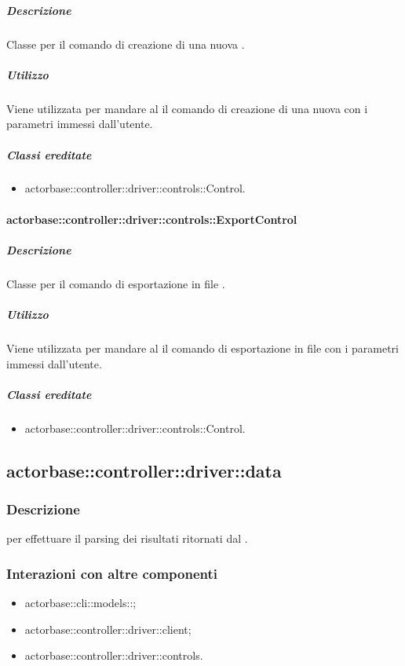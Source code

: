 \documentclass{scalatekids-article}
\begin{document}
\subparagraph{Descrizione}

Classe per il comando di creazione di una nuova .

\subparagraph{Utilizzo}

Viene utilizzata per mandare al  il comando di creazione di una
nuova  con i parametri immessi dall'utente.

\subparagraph{Classi ereditate}

\begin{itemize}
\item actorbase::controller::driver::controls::Control.
\end{itemize}

\paragraph{actorbase::controller::driver::controls::ExportControl}

\subparagraph{Descrizione}

Classe per il comando di esportazione in file .

\subparagraph{Utilizzo}

Viene utilizzata per mandare al  il comando di esportazione in
file  con i parametri immessi dall'utente.

\subparagraph{Classi ereditate}

\begin{itemize}
\item actorbase::controller::driver::controls::Control.
\end{itemize}

\subsection{actorbase::controller::driver::data}

\subsubsection{Descrizione}

 per effettuare il parsing dei risultati ritornati dal
.

\subsubsection{Interazioni con altre componenti}
\begin{itemize}
\item actorbase::cli::models::;
\item actorbase::controller::driver::client;
\item actorbase::controller::driver::controls.
\end{itemize}
\end{document}

